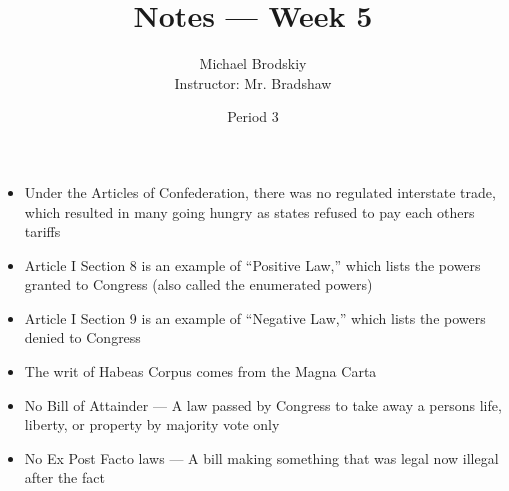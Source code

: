 \documentclass[12pt]{article}
\title{Notes — Week 5}
\date{Period 3}
\author{Michael Brodskiy\\ \small Instructor: Mr. Bradshaw}
\begin{document}
\maketitle

\begin{itemize}

  \item Under the Articles of Confederation, there was no regulated interstate trade, which resulted in many going hungry as states refused to pay each others tariffs

  \item Article I Section 8 is an example of “Positive Law,” which lists the powers granted to Congress (also called the enumerated powers)

  \item Article I Section 9 is an example of “Negative Law,” which lists the powers denied to Congress

  \item The writ of Habeas Corpus comes from the Magna Carta

  \item No Bill of Attainder — A law passed by Congress to take away a persons life, liberty, or property by majority vote only

  \item No Ex Post Facto laws — A bill making something that was legal now illegal after the fact

\end{itemize}
\end{document}
